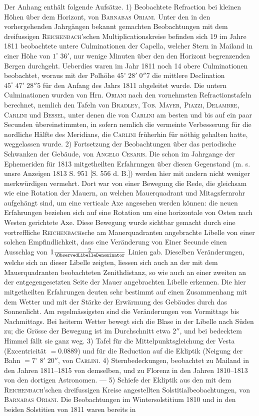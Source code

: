 Der Anhang enthält folgende Aufsätze. 1) Beobachtete Refraction bei kleinen Höhen über dem Horizont, von \textsc{Barnabas Oriani}. Unter den in den vorhergehenden Jahrgängen bekannt gemachten Beobachtungen mit dem dreifussigen \textsc{Reichenbach}'schen Multiplicationskreise befinden sich 19 im Jahre 1811 beobachtete untere Culminationen der Capella, welcher Stern in Mailand in einer Höhe von $1^\circ\;36'$, nur wenige Minuten über den den Horizont begrenzenden Bergen durchgeht. Ueberdies waren im Jahr 1811 noch 14 obere Culminationen beobachtet, woraus mit der Polhöhe $45^\circ\;28'\;0''7$ die mittlere Declination $45^\circ\;47'\;28''5$ für den Anfang des Jahrs 1811 abgeleitet wurde. Die untern Culminationen wurden von Hrn. \textsc{Oriani} nach den vornehmsten Refractionstafeln berechnet, nemlich den Tafeln von \textsc{Bradley}, \textsc{Tob. Mayer}, \textsc{Piazzi}, \textsc{Delambre}, \textsc{Carlini} und \textsc{Bessel}, unter denen die von \textsc{Carlini} am besten und bis auf ein paar Secunden übereinstimmten, in sofern nemlich die vermeinte Verbesserung für die nordliche Hälfte des Meridians, die \textsc{Carlini} früherhin für nöthig gehalten hatte, weggelassen wurde. 2) Fortsetzung der Beobachtungen über das periodische Schwanken der Gebäude, von \textsc{Angelo Cesaris}. Die schon im Jahrgange der Ephemeriden für 1813 mitgetheilten Erfahrnngen über diesen Gegenstand (m. s. unsre Anzeigen 1813 S. 951 [S. 556 d. B.]) werden hier mit andern nicht weniger merkwürdigen vermehrt. Dort war von einer Bewegung die Rede, die gleichsam wie eine Rotation der Mauern, an welchen Mauerquadrant und Mitagsfernrohr aufgehängt sind, um eine verticale Axe angesehen werden können: die neuen Erfahrungen beziehen sich auf eine Rotation um eine horizontale von Osten nach Westen gerichtete Axe. Diese Bewegung wurde sichtbar gemacht durch eine vortreffliche \textsc{Reichenbach}sche am Mauerquadranten angebrachte Libelle von einer solchen Empfindlichkeit, dass eine Veränderung von Einer Secunde einen Ausschlag von $1\frac{2}{\ObservedLibelleDenominator}$ Linien gab. Dieselben Veränderungen, welche sich an dieser Libelle zeigten, liessen sich auch an der mit dem Mauerquadranten beobachteten Zenithdistanz, so wie auch an einer zweiten an der entgegengesetzten Seite der Mauer angebrachten Libelle erkennen. Die hier mitgetheilten Erfahrungen deuten sehr bestimmt auf einen Zusammenhang mit dem Wetter und mit der Stärke der Erwärmung des Gebäudes durch das Sonnenlicht. Am regelmässigsten sind die Veränderungen von Vormittags bis Nachmittags. Bei heiterm Wetter bewegt sich die Blase in der Libelle nach Süden zu; die Grösse der Bewegung ist im Durchschnitt etwa $2''$, und bei bedecktem Himmel fällt sie ganz weg. 3) Tafel für die Mittelpunktsgleichung der Vesta (Excentricität $=0.0889$) und für die Reduction auf die Ekliptik (Neigung der Bahn $=7^\circ\;8'\;20''$, von \textsc{Carlini}. 4) Sternbedeckungen, beobachtet zu Mailand in den Jahren 1811--1815 von demselben, und zu Florenz in den Jahren 1810--1813 von den dortigen Astronomen. --- 5) Schiefe der Ekliptik aus den mit dem \textsc{Reichenbach}'schen dreifussigen Kreise angestellten Solstitialbeobachtungen, von \textsc{Barnabas Oriani}. Die Beobachtungen im Wintersolstitium 1810 und in den beiden Solstitien von 1811 waren bereits in 